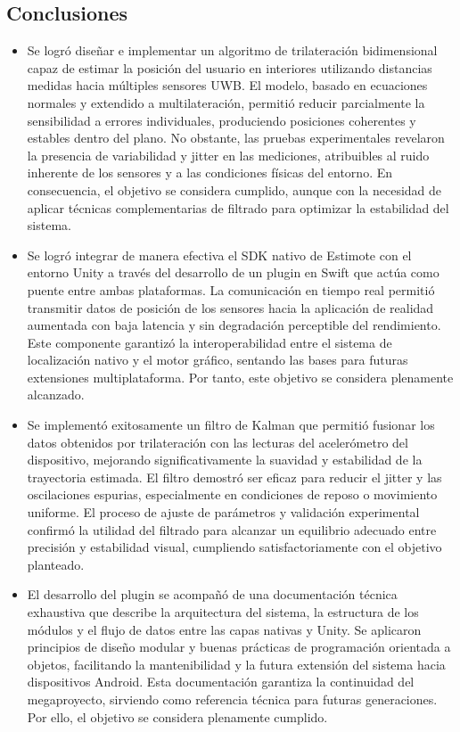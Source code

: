 \subsection{Conclusiones}

\begin{itemize}
\item Se logró diseñar e implementar un algoritmo de trilateración bidimensional capaz de estimar la posición del usuario en interiores utilizando distancias medidas hacia múltiples sensores UWB. El modelo, basado en ecuaciones normales y extendido a multilateración, permitió reducir parcialmente la sensibilidad a errores individuales, produciendo posiciones coherentes y estables dentro del plano. No obstante, las pruebas experimentales revelaron la presencia de variabilidad y jitter en las mediciones, atribuibles al ruido inherente de los sensores y a las condiciones físicas del entorno. En consecuencia, el objetivo se considera cumplido, aunque con la necesidad de aplicar técnicas complementarias de filtrado para optimizar la estabilidad del sistema.

\item Se logró integrar de manera efectiva el SDK nativo de Estimote con el entorno Unity a través del desarrollo de un plugin en Swift que actúa como puente entre ambas plataformas. La comunicación en tiempo real permitió transmitir datos de posición de los sensores hacia la aplicación de realidad aumentada con baja latencia y sin degradación perceptible del rendimiento. Este componente garantizó la interoperabilidad entre el sistema de localización nativo y el motor gráfico, sentando las bases para futuras extensiones multiplataforma. Por tanto, este objetivo se considera plenamente alcanzado.

\item Se implementó exitosamente un filtro de Kalman que permitió fusionar los datos obtenidos por trilateración con las lecturas del acelerómetro del dispositivo, mejorando significativamente la suavidad y estabilidad de la trayectoria estimada. El filtro demostró ser eficaz para reducir el jitter y las oscilaciones espurias, especialmente en condiciones de reposo o movimiento uniforme. El proceso de ajuste de parámetros y validación experimental confirmó la utilidad del filtrado para alcanzar un equilibrio adecuado entre precisión y estabilidad visual, cumpliendo satisfactoriamente con el objetivo planteado.

\item El desarrollo del plugin se acompañó de una documentación técnica exhaustiva que describe la arquitectura del sistema, la estructura de los módulos y el flujo de datos entre las capas nativas y Unity. Se aplicaron principios de diseño modular y buenas prácticas de programación orientada a objetos, facilitando la mantenibilidad y la futura extensión del sistema hacia dispositivos Android. Esta documentación garantiza la continuidad del megaproyecto, sirviendo como referencia técnica para futuras generaciones. Por ello, el objetivo se considera plenamente cumplido.


\end{itemize}
